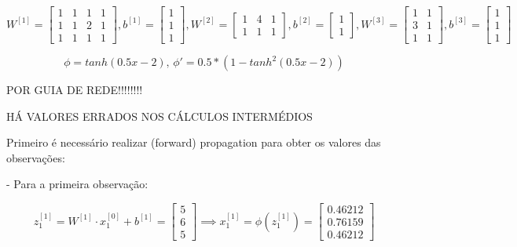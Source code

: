 \documentclass[a4paper,12pt]{article} %
\begin{document}
\begin{enumerate}
\begin{equation*}
    W^{[1]} = \begin{bmatrix} 1 & 1 & 1 & 1 \\ 1 & 1 & 2 & 1 \\ 1 & 1 & 1 & 1 \end{bmatrix} , b^{[1]} = \begin{bmatrix} 1 \\ 1 \\ 1 \end{bmatrix}, W^{[2]} = \begin{bmatrix} 1 & 4 & 1 \\  1 & 1 & 1 \end{bmatrix} , b^{[2]} = \begin{bmatrix} 1 \\ 1 \end{bmatrix}, W^{[3]} = \begin{bmatrix} 1 & 1 \\ 3 & 1 \\ 1 & 1 \end{bmatrix} , b^{[3]} = \begin{bmatrix} 1 \\ 1 \\ 1 \end{bmatrix}
\end{equation*}

\begin{equation*}
    \phi = tanh(0.5x -2) \text{, } \phi' = 0.5 * (1 - tanh^2(0.5x -2))
\end{equation*}

POR GUIA DE REDE!!!!!!!!

HÁ VALORES ERRADOS NOS CÁLCULOS INTERMÉDIOS 

Primeiro é necessário realizar (forward) propagation para obter os valores das observações:

- Para a primeira observação:

\begin{equation*}
    z^{[1]}_1 = W^{[1]} \cdot x^{[0]}_1 + b^{[1]} = \begin{bmatrix} 5 \\ 6 \\ 5 \end{bmatrix} \implies x^{[1]}_1 = \phi(z^{[1]}_1)= \begin{bmatrix} 0.46212 \\ 0.76159 \\ 0.46212 \end{bmatrix}
\end{equation*}


\end{enumerate}
\end{document}
